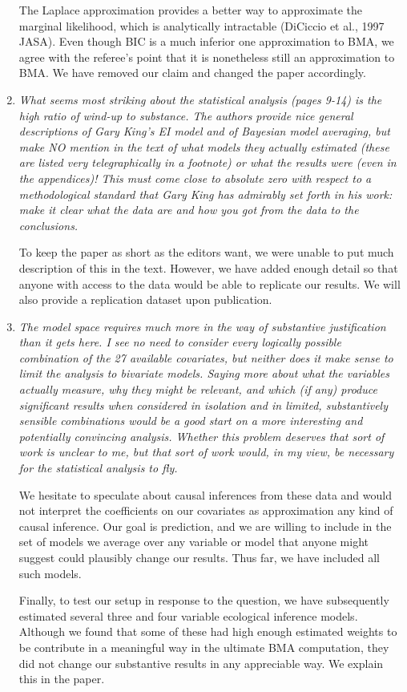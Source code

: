 \documentclass[11pt]{article}
\begin{document}
\begin{enumerate}
  The Laplace approximation provides a better way to approximate the
  marginal likelihood, which is analytically intractable (DiCiccio et
  al., 1997 JASA).  Even though BIC is a much inferior one
  approximation to BMA, we agree with the referee's point that it is
  nonetheless still an approximation to BMA.  We have removed our
  claim and changed the paper accordingly.
  
\item {\it What seems most striking about the statistical analysis (pages
  9-14) is the high ratio of wind-up to substance.  The authors
  provide nice general descriptions of Gary King's EI model and of
  Bayesian model averaging, but make NO mention in the text of what
  models they actually estimated (these are listed very
  telegraphically in a footnote) or what the results were (even in the
  appendices)!  This must come close to absolute zero with respect to
  a methodological standard that Gary King has admirably set forth in
  his work: make it clear what the data are and how you got from the
  data to the conclusions.}

To keep the paper as short as the editors want, we were unable to put
much description of this in the text.  However, we have added enough
detail so that anyone with access to the data would be able to
replicate our results.  We will also provide a replication dataset
upon publication.

\item {\it The model space requires much more in the way of
    substantive justification than it gets here.  I see no need to
    consider every logically possible combination of the 27 available
    covariates, but neither does it make sense to limit the analysis
    to bivariate models.  Saying more about what the variables
    actually measure, why they might be relevant, and which (if any)
    produce significant results when considered in isolation and in
    limited, substantively sensible combinations would be a good start
    on a more interesting and potentially convincing analysis.
    Whether this problem deserves that sort of work is unclear to me,
    but that sort of work would, in my view, be necessary for the
    statistical analysis to fly.}
 
  We hesitate to speculate about causal inferences from these data and
  would not interpret the coefficients on our covariates as
  approximation any kind of causal inference.  Our goal is prediction,
  and we are willing to include in the set of models we average over
  any variable or model that anyone might suggest could plausibly
  change our results.  Thus far, we have included all such models.
  
  Finally, to test our setup in response to the question, we have
  subsequently estimated several three and four variable ecological
  inference models.  Although we found that some of these had high
  enough estimated weights to be contribute in a meaningful way in the
  ultimate BMA computation, they did not change our substantive
  results in any appreciable way. We explain this in the paper.
\end{enumerate}
\end{document}

